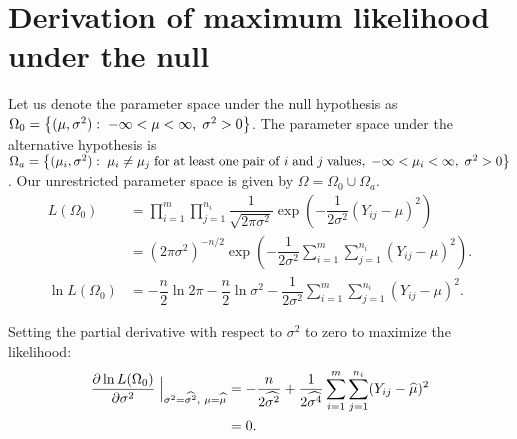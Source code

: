 \documentclass[12pt,a4paper,openright]{article}
\newcommand{\wmu}{\widehat{\mu}}
\newcommand{\wst}{\widehat{\sigma^2}}
\begin{document}
	\section{Derivation of maximum likelihood under the null}
	Let us denote the parameter space under the null hypothesis as $\Omega_0 = \left\{(\mu, \sigma^2):\hspace{0.1cm} -\infty < \mu < \infty, \hspace{0.1cm}\sigma^2 > 0\right\}$. The parameter space under the alternative hypothesis is \\
	$\Omega_a = \left\{(\mu_i, \sigma^2): \hspace{0.1cm}\mu_i \neq \mu_j \hspace{0.1cm}\mathrm{for\hspace{0.1cm}at\hspace{0.1cm}least\hspace{0.1cm}one\hspace{0.1cm}pair\hspace{0.1cm}of\hspace{0.1cm}}i\mathrm{\hspace{0.1cm}and\hspace{0.1cm}}j\mathrm{\hspace{0.1cm}values},\hspace{0.1cm}-\infty < \mu_i < \infty,\hspace{0.1cm} \sigma^2 > 0\right\}$. Our unrestricted parameter space is given by $\Omega = \Omega_0 \cup \Omega_a$. 
	\begin{align}
		L(\Omega_0) &= \prod_{i=1}^m \prod_{j=1}^{n_i} \dfrac{1}{\sqrt{2\pi \sigma^2}} \exp{\left(-\dfrac{1}{2\sigma^2} (Y_{ij}-\mu)^2\right)} \nonumber\\
		&= (2\pi \sigma^2)^{-n/2}\exp{\left(-\dfrac{1}{2\sigma^2} \sum_{i=1}^m \sum_{j=1}^{n_i} (Y_{ij}-\mu)^2\right)}. \label{LH0}\\
		\ln{L(\Omega_0)} &= -\dfrac{n}{2} \ln{2\pi} - \dfrac{n}{2}\ln{\sigma^2} - \dfrac{1}{2\sigma^2} \sum_{i=1}^m \sum_{j=1}^{n_i} (Y_{ij}-\mu)^2. \nonumber
	\end{align}

	Setting the partial derivative with respect to $\sigma^2$ to zero to maximize the likelihood:
	\begin{align}
		\dfrac{\partial \ln{L(\Omega_0)}}{\partial \sigma^2} \Bigm\lvert_{\sigma^2=\wst, \hspace{0.1cm}\mu = \wmu} &= -\dfrac{n}{2\wst} + \dfrac{1}{2\widehat{\sigma^4}}\sum_{i=1}^m \sum_{j=1}^{n_i} (Y_{ij}-\wmu)^2 \nonumber\\
		&= 0. \label{varNull}
	\end{align}
\end{document}
